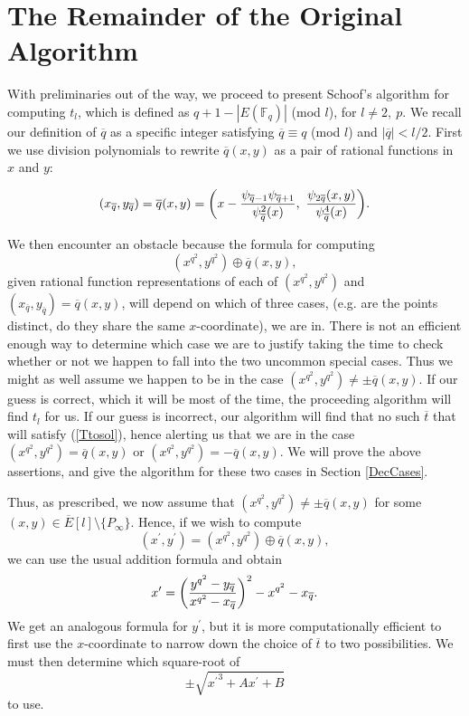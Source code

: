 \documentclass{article}
\newcommand{\f}{\mathbb{F}}
\begin{document}
\section{The Remainder of the Original Algorithm}

With preliminaries out of the way, we proceed to present Schoof's algorithm for computing $t_l$,
which is defined as $q + 1 - |E(\f_q)|$ (mod $l$), for $l \not = 2,~p$.  We recall our definition
of $\overline{q}$ as a specific integer satisfying $\overline{q} \equiv q$ (mod $l$) and
$|\overline{q}| < l/2$.  First we use division polynomials to rewrite $\overline{q}(x,y)$ as a pair
of rational functions in $x$ and $y$:

$$(x_{\overline{q}}, y_{\overline{q}}) = \overline{q}(x,y) = \bigg(x-{\psi_{\overline{q}-1}\psi_{\overline{q}+1}\over \psi_{\overline{q}}^2(x)} ,
~{\psi_{2\overline{q}}(x,y) \over \psi_{\overline{q}}^4(x)}\bigg).$$

We then encounter an obstacle because the formula for computing
$$(x^{q^2},y^{q^2}) \oplus \overline{q}(x,y),$$ given rational
function representations of each of $(x^{q^2},y^{q^2})$ and
$(x_{\overline{q}},y_{\overline{q}}) = \overline{q}(x,y)$, will
depend on which of three cases, (e.g. are the points distinct, do
they share the same $x$-coordinate), we are in.  There is not an efficient enough way to determine which case we are to justify taking the time to check 
whether or not we happen to fall into the two uncommon special cases.  Thus we might as well assume we happen to be in the case 
$(x^{q^2},y^{q^2}) \not = \pm \overline{q}(x,y)$.  If our guess is correct, 
which it will be most of the time, the proceeding algorithm will find $t_l$ for us.  If our guess is incorrect, our algorithm 
will find that no such $\overline{t}$ that will satisfy (\ref{Ttosol}), hence alerting us that we are in the case
$(x^{q^2},y^{q^2}) = \overline{q}(x,y)$ or  $(x^{q^2},y^{q^2}) = - \overline{q}(x,y)$.  We will prove the above assertions, and give the algorithm for 
these two cases in Section \ref{DecCases}.

Thus, as prescribed, we now assume that
$(x^{q^2},y^{q^2}) \not = \pm \overline{q}(x,y)$ for some $(x,y) \in
\overline{E}[l]\setminus\{P_\infty\}$.  Hence, if we wish to compute
$$(x^\prime, y^\prime) = (x^{q^2},y^{q^2}) \oplus \overline{q}(x,y),$$ we can use the usual addition formula and obtain
$$x^\prime = \bigg({y^{q^2}-y_{\overline{q}} \over x^{q^2}-x_{\overline{q}}}\bigg)^2 - x^{q^2}- x_{\overline{q}}.$$
We get an analogous formula for $y^\prime$, but it is more
computationally efficient to first use the $x$-coordinate to narrow
down the choice of $\overline{t}$ to two possibilities. We must then
determine which square-root of
$$\pm \sqrt{{x^\prime}^3 + Ax^\prime + B}$$ to use.
\end{document}

